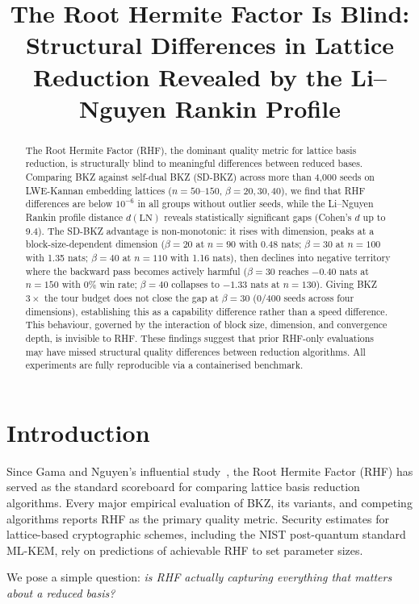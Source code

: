 \documentclass[journal=cic,version=preprint]{iacrj}
\title[running={The Root Hermite Factor Is Blind}]{The Root Hermite Factor Is Blind: Structural Differences in Lattice Reduction Revealed by the Li--Nguyen Rankin Profile}
\begin{document}
\maketitle

\begin{abstract}
The Root Hermite Factor (RHF), the dominant quality metric for lattice basis reduction, is structurally blind to meaningful differences between reduced bases. Comparing BKZ against self-dual BKZ (SD-BKZ) across more than 4{,}000 seeds on LWE-Kannan embedding lattices ($n = 50$--$150$, $\beta = 20, 30, 40$), we find that RHF differences are below $10^{-6}$ in all groups without outlier seeds, while the Li--Nguyen Rankin profile distance $d(\mathrm{LN})$ reveals statistically significant gaps (Cohen's $d$ up to 9.4). The SD-BKZ advantage is non-monotonic: it rises with dimension, peaks at a block-size-dependent dimension ($\beta=20$ at $n=90$ with 0.48 nats; $\beta=30$ at $n=100$ with 1.35 nats; $\beta=40$ at $n=110$ with 1.16 nats), then declines into negative territory where the backward pass becomes actively harmful ($\beta=30$ reaches $-0.40$ nats at $n=150$ with 0\% win rate; $\beta=40$ collapses to $-1.33$ nats at $n=130$). Giving BKZ $3\times$ the tour budget does not close the gap at $\beta=30$ (0/400 seeds across four dimensions), establishing this as a capability difference rather than a speed difference. This behaviour, governed by the interaction of block size, dimension, and convergence depth, is invisible to RHF. These findings suggest that prior RHF-only evaluations may have missed structural quality differences between reduction algorithms. All experiments are fully reproducible via a containerised benchmark.
\end{abstract}

\section{Introduction}
\label{sec:intro}

Since Gama and Nguyen's influential study~\cite{EC:GamNgu08}, the Root Hermite Factor (RHF) has served as the standard scoreboard for comparing lattice basis reduction algorithms. Every major empirical evaluation of BKZ, its variants, and competing algorithms reports RHF as the primary quality metric. Security estimates for lattice-based cryptographic schemes, including the NIST post-quantum standard ML-KEM, rely on predictions of achievable RHF to set parameter sizes.

We pose a simple question: \emph{is RHF actually capturing everything that matters about a reduced basis?}
\end{document}
